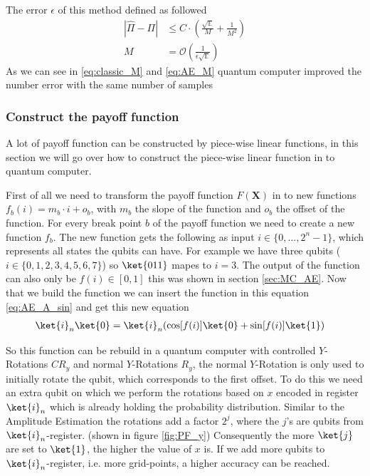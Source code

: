 \documentclass[../../main.tex]{subfiles}
\begin{document}
The error $\epsilon$ of this method defined as followed
\begin{align}
    |\hat{\Pi} - \Pi| &\leq C\cdot(\frac{\sqrt{\mathbb{E}}}{M} + \frac{1}{M^2}) \nonumber \\
    M &= \mathcal{O}(\frac{1}{\epsilon \sqrt{\mathbb{E}}}) \label{eq:AE_M}
\end{align}
As we can see in \ref{eq:classic_M} and \ref{eq:AE_M} quantum computer improved the number error with the same number of samples
\subsubsection{Construct the payoff function}\label{sec:MC_Payoff}
A lot of payoff function can be constructed by piece-wise linear functions, in this section we will go over how to construct the piece-wise linear function in to quantum computer.

First of all we need to transform the payoff function $F(\textbf{X})$ in to new functions $f_b(i)=m_b\cdot i + o_b$, with $m_b$ the slope of the function and $o_b$ the offset of the function. For every break point $b$ of the payoff function we need to create a new function $f_b$. The new function gets the following as input $i\in\{0,\ldots, 2^n-1\}$, which represents all states the qubits can have. For example we have three qubits ($i\in\{0,1,2,3,4,5,6,7\}$) so $\ket{011}$ mapes to $i=3$. The output of the function can also only be $f(i)\in[0,1]$ this was shown in section \ref{sec:MC_AE}. Now that we build the function we can insert the function in this equation \ref{eq:AE_A_sin} and get this new equation
\begin{align}
    \ket{i}_n\ket{0} &= \ket{i}_n(\cos[f(i)]\ket{0}+\sin[f(i)]\ket{1}) \label{eq:PF_f}
\end{align}

So this function can be rebuild in a quantum computer with controlled $Y$-Rotations $CR_y$ and normal $Y$-Rotations $R_y$, the normal $Y$-Rotation is only used to initially rotate the qubit, which corresponds to the first offset. To do this we need an extra qubit on which we perform the rotations based on $x$ encoded in register $\ket{i}_n$ which is already holding the probability distribution. Similar to the Amplitude Estimation the rotations add a factor $2^{j}$, where the ${j}$'s are qubits from $\ket{i}_n$-register. (shown in figure \ref{fig:PF_y}) Consequently the more $\ket{j}$ are set to $\ket{1}$, the higher the value of $x$ is. If we add more qubits to $\ket{i}_n$-register, i.e. more grid-points, a higher accuracy can be reached.
\end{document}
